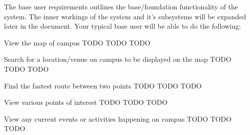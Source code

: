 The base user requirements outlines the base/foundation functionality of the system. The inner workings of the system and it's subsystems will be expanded later in the document. Your typical base user will be able to do the following:

\FuncReq
{View the map of campus}
{TODO}
{TODO}
{TODO}

\FuncReq
{Search for a location/venue on campus to be displayed on the map}
{TODO}
{TODO}
{TODO}

\FuncReq
{Find the fastest route between two points}%
{TODO}
{TODO}
{TODO}

\FuncReq
{View various points of interest}
{TODO}
{TODO}
{TODO}

\FuncReq
{View any current events or activities happening on campus}
{TODO}
{TODO}
{TODO}